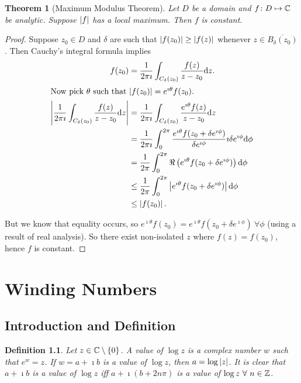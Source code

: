 \documentclass{notes}
\theoremstyle{plain}
\newtheorem{theorem}[proposition]{Theorem}
\newtheorem{definition}[proposition]{Definition}
\begin{document}
\begin{theorem}[Maximum Modulus Theorem]%
   Let $D$ be a domain  and $f
  \colon D \mapsto \mathbb{C}$ be analytic.  Suppose $\left|f\right|$ has a local maximum.
  Then $f$ is constant.
\end{theorem}

\begin{proof}
Suppose $z_0 \in D$ and $\delta$ are such that $\left|f(z_0)\right| \ge \left|f(z)\right|$
whenever $z \in \overline{B_\delta(z_0)}$.  Then Cauchy's integral formula
implies
\begin{align*}
f(z_0) &= \frac{1}{2 \pi \imath} \int_{C_\delta(z_0)} \frac{f(z)}{z-z_0} \mathrm{d} z.\\
\intertext{Now pick $\theta$ such that $\left|f(z_0)\right| = e^{\imath \theta}
f(z_0)$.}
\left|\frac{1}{2 \pi \imath} \int_{C_\delta(z_0)} \frac{f(z)}{z-z_0} \mathrm{d} z\right|
& = \frac{1}{2 \pi \imath} \int_{C_\delta(z_0)} \frac{e^{\imath \theta} f(z)}
{z-z_0} \mathrm{d} z \\
&=\frac{1}{2 \pi \imath} \int_0^{2 \pi} \frac{e^{\imath \theta} f(z_0 + \delta
e^{\imath \phi})}{\delta e^{\imath \phi}} \imath \delta e^{\imath \phi}
\mathrm{d}\phi \\
&=\frac{1}{2 \pi} \int_0^{2 \pi} \Re \left(
e^{\imath \theta} f(z_0 + \delta e^{\imath \phi})
\right) \mathrm{d}\phi \\
&\le \frac{1}{2 \pi}\int_0^{2 \pi} \left|e^{\imath \theta} f(z_0 +
\delta e^{\imath\phi})\right| \mathrm{d}\phi \\
&\le \left|f(z_0)\right|.
\end{align*}

But we know that equality occurs, so $e^{\imath \theta} f(z_0) =
e^{\imath \theta} f(z_0 + \delta e^{\imath \phi})\ \forall \phi$ (using a
result of real analysis).  So there exist non-isolated $z$ where
$f(z) = f(z_0)$, hence $f$ is constant. 
\end{proof}

\chapter{Winding Numbers}

\section{Introduction and Definition}

\begin{definition}
Let $z \in \mathbb{C} \setminus \{ 0 \}$.  A value of $\log z$ is a complex number
$w$ such that $e^w = z$.  If $w = a + \imath b$ is a value of $\log z$, then
$a = \log \left|z\right|$.  It is clear that $a + \imath b$ is a value of $\log z$
iff $a +  \imath (b+ 2 n \pi)$ is a value of $\log z\ \forall\ n \in \mathbb{Z}$.
\end{definition}
\end{document}
